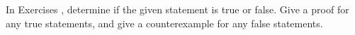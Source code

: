 {\noin In Exercises }
{, determine if the given statement is true or false. Give a proof for any true statements, and give a counterexample for any false statements.}
